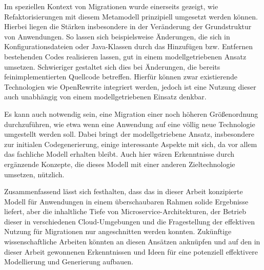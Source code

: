 Im speziellen Kontext von Migrationen wurde einerseits gezeigt, wie Refaktorisierungen mit diesem Metamodell prinzipiell umgesetzt werden können. Hierbei liegen die Stärken insbesondere in der Veränderung der Grundstruktur von Anwendungen. So lassen sich beispielsweise Änderungen, die sich in Konfigurationsdateien oder Java-Klassen durch das Hinzufügen bzw. Entfernen bestehenden Codes realisieren lassen, gut in einem modellgetriebenen Ansatz umsetzen. Schwieriger gestaltet sich dies bei Änderungen, die bereits feinimplementierten Quellcode betreffen. Hierfür können zwar existierende Technologien wie OpenRewrite integriert werden, jedoch ist eine Nutzung dieser auch unabhängig von einem modellgetriebenen Einsatz denkbar.

Es kann auch notwendig sein, eine Migration einer noch höheren Größenordnung durchzuführen, wie etwa wenn eine Anwendung auf eine völlig neue Technologie umgestellt werden soll. Dabei bringt der modellgetriebene Ansatz, insbesondere zur initialen Codegenerierung, einige interessante Aspekte mit sich, da vor allem das fachliche Modell erhalten bleibt. Auch hier wären Erkenntnisse durch ergänzende Konzepte, die dieses Modell mit einer anderen Zieltechnologie umsetzen, nützlich.

Zusammenfassend lässt sich festhalten, dass das in dieser Arbeit konzipierte Modell für Anwendungen in einem überschaubaren Rahmen solide Ergebnisse liefert, aber die inhaltliche Tiefe von Microservice-Architekturen, der Betrieb dieser in verschiedenen Cloud-Umgebungen und die Fragestellung der effektiven Nutzung für Migrationen nur angeschnitten werden konnten. Zukünftige wissenschaftliche Arbeiten könnten an diesen Ansätzen anknüpfen und auf den in dieser Arbeit gewonnenen Erkenntnissen und Ideen für eine potenziell effektivere Modellierung und Generierung aufbauen.
